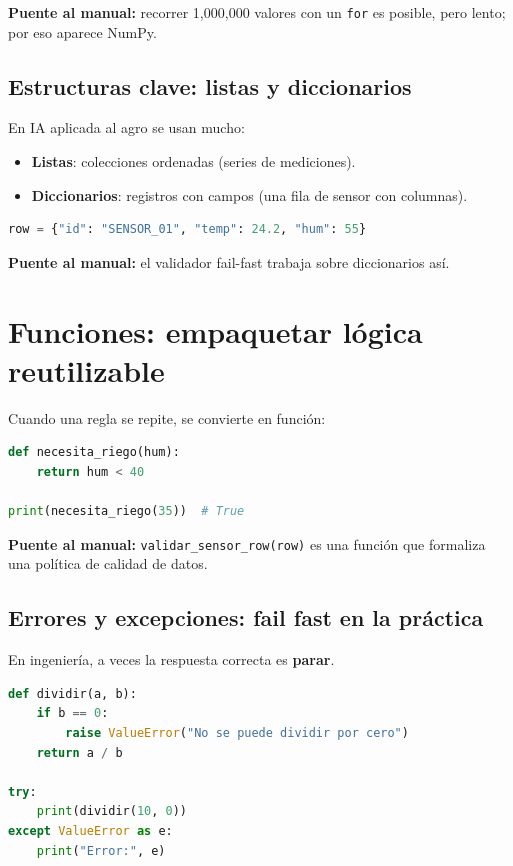 \documentclass[11pt, a4paper]{article}
\begin{document}
\textbf{Puente al manual:} recorrer 1,000,000 valores con un \texttt{for} es posible, pero lento; por eso aparece NumPy.

\subsection{Estructuras clave: listas y diccionarios}
En IA aplicada al agro se usan mucho:

\begin{itemize}
\item \textbf{Listas}: colecciones ordenadas (series de mediciones).
\item \textbf{Diccionarios}: registros con campos (una fila de sensor con columnas).
\end{itemize}

\begin{lstlisting}[language=Python, caption={Registro tipo diccionario (una fila de sensor)}]
row = {"id": "SENSOR_01", "temp": 24.2, "hum": 55}
\end{lstlisting}

\textbf{Puente al manual:} el validador fail-fast trabaja sobre diccionarios así.
\newpage
\section{Funciones: empaquetar lógica reutilizable}
Cuando una regla se repite, se convierte en función:

\begin{lstlisting}[language=Python, caption={Función simple reutilizable}]
def necesita_riego(hum):
    return hum < 40

print(necesita_riego(35))  # True
\end{lstlisting}

\textbf{Puente al manual:} \texttt{validar\_sensor\_row(row)} es una función que formaliza una política de calidad de datos.

\subsection{Errores y excepciones: fail fast en la práctica}
En ingeniería, a veces la respuesta correcta es \textbf{parar}.

\begin{lstlisting}[language=Python, caption={Excepciones con try/except}]
def dividir(a, b):
    if b == 0:
        raise ValueError("No se puede dividir por cero")
    return a / b

try:
    print(dividir(10, 0))
except ValueError as e:
    print("Error:", e)
\end{lstlisting}
\end{document}

